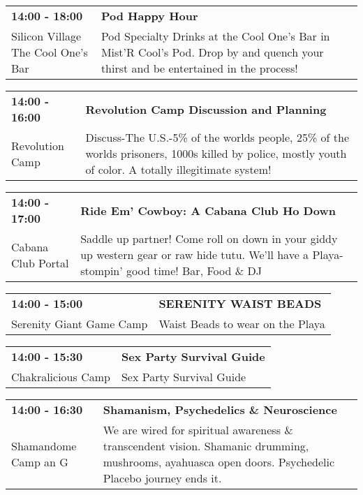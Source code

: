 \begin{tabular}{ p{1in} p{2.2in} }
    \textbf{14:00 - 18:00} & \textbf{Pod Happy Hour} \\
    Silicon Village \newline The Cool One's Bar & Pod Specialty Drinks at the Cool One's Bar in Mist'R Cool's Pod.
Drop by and quench your thirst and be entertained in the process! \\
    \hline 
\end{tabular}
    
\begin{tabular}{ p{1in} p{2.2in} }
    \textbf{14:00 - 16:00} & \textbf{Revolution Camp Discussion and Planning} \\
    Revolution Camp \newline  & Discuss-The U.S.-5\% of the worlds people, 25\% of the worlds prisoners, 1000s killed by police, mostly youth of color. A totally illegitimate system! \\
    \hline 
\end{tabular}
    
\begin{tabular}{ p{1in} p{2.2in} }
    \textbf{14:00 - 17:00} & \textbf{Ride Em' Cowboy: A Cabana Club Ho Down} \\
    Cabana Club \newline 430 Portal & Saddle up partner! Come roll on down in your giddy up western gear or raw hide tutu.  We'll have a Playa-stompin' good time! Bar, Food \& DJ \\
    \hline 
\end{tabular}
    
\begin{tabular}{ p{1in} p{2.2in} }
    \textbf{14:00 - 15:00} & \textbf{SERENITY WAIST BEADS} \\
    Serenity Giant Game Camp \newline  & Waist Beads to wear on the Playa \\
    \hline 
\end{tabular}
    
\begin{tabular}{ p{1in} p{2.2in} }
    \textbf{14:00 - 15:30} & \textbf{Sex Party Survival Guide} \\
    Chakralicious Camp \newline  & Sex Party Survival Guide \\
    \hline 
\end{tabular}
    
\begin{tabular}{ p{1in} p{2.2in} }
    \textbf{14:00 - 16:30} & \textbf{Shamanism, Psychedelics \& Neuroscience} \\
    Shamandome Camp \newline 615 an G & We are wired for spiritual awareness \& transcendent vision. Shamanic drumming, mushrooms, ayahuasca  open doors. Psychedelic Placebo journey ends it. \\
    \hline 
\end{tabular}
    
